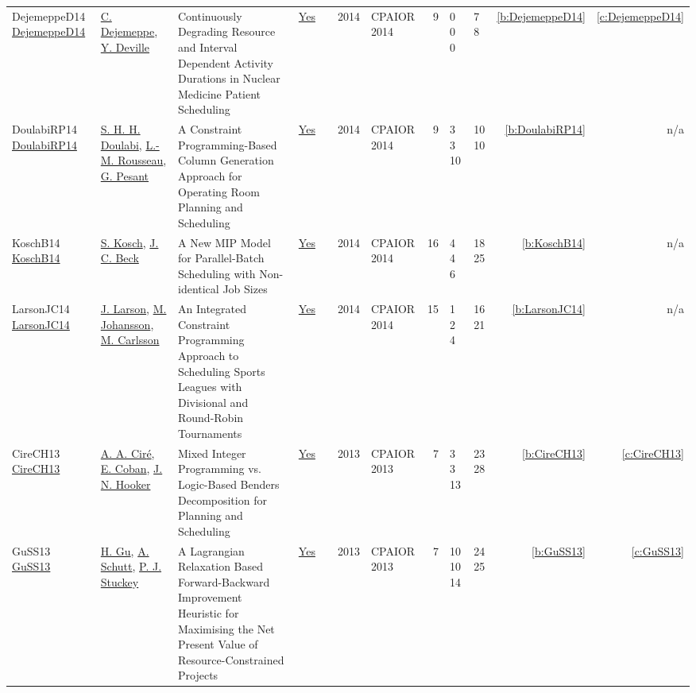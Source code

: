 {\begin{longtable}{>{\raggedright\arraybackslash}p{3cm}>{\raggedright\arraybackslash}p{4.5cm}>{\raggedright\arraybackslash}p{6.0cm}rrrp{2.5cm}rp{1cm}p{1cm}rr}
DejemeppeD14 \href{https://doi.org/10.1007/978-3-319-07046-9_20}{DejemeppeD14} & \hyperref[auth:a202]{C. Dejemeppe}, \hyperref[auth:a151]{Y. Deville} & \cellcolor{green!10}Continuously Degrading Resource and Interval Dependent Activity Durations in Nuclear Medicine Patient Scheduling & \href{../works/DejemeppeD14.pdf}{Yes} & \cite{DejemeppeD14} & 2014 & CPAIOR 2014 & 9 & 0 0 0 & 7 8 & \ref{b:DejemeppeD14} & \ref{c:DejemeppeD14}\\
DoulabiRP14 \href{https://doi.org/10.1007/978-3-319-07046-9_32}{DoulabiRP14} & \hyperref[auth:a330]{S. H. H. Doulabi}, \hyperref[auth:a326]{L.-M. Rousseau}, \hyperref[auth:a8]{G. Pesant} & A Constraint Programming-Based Column Generation Approach for Operating Room Planning and Scheduling & \href{../works/DoulabiRP14.pdf}{Yes} & \cite{DoulabiRP14} & 2014 & CPAIOR 2014 & 9 & 3 3 10 & 10 10 & \ref{b:DoulabiRP14} & n/a\\
KoschB14 \href{https://doi.org/10.1007/978-3-319-07046-9_5}{KoschB14} & \hyperref[auth:a327]{S. Kosch}, \hyperref[auth:a89]{J. C. Beck} & A New {MIP} Model for Parallel-Batch Scheduling with Non-identical Job Sizes & \href{../works/KoschB14.pdf}{Yes} & \cite{KoschB14} & 2014 & CPAIOR 2014 & 16 & 4 4 6 & 18 25 & \ref{b:KoschB14} & n/a\\
LarsonJC14 \href{https://doi.org/10.1007/978-3-319-07046-9_11}{LarsonJC14} & \hyperref[auth:a1413]{J. Larson}, \hyperref[auth:a75]{M. Johansson}, \hyperref[auth:a91]{M. Carlsson} & An Integrated Constraint Programming Approach to Scheduling Sports Leagues with Divisional and Round-Robin Tournaments & \href{../works/LarsonJC14.pdf}{Yes} & \cite{LarsonJC14} & 2014 & CPAIOR 2014 & 15 & 1 2 4 & 16 21 & \ref{b:LarsonJC14} & n/a\\
CireCH13 \href{https://doi.org/10.1007/978-3-642-38171-3_22}{CireCH13} & \hyperref[auth:a157]{A. A. Cir{\'{e}}}, \hyperref[auth:a335]{E. Coban}, \hyperref[auth:a160]{J. N. Hooker} & Mixed Integer Programming vs. Logic-Based Benders Decomposition for Planning and Scheduling & \href{../works/CireCH13.pdf}{Yes} & \cite{CireCH13} & 2013 & CPAIOR 2013 & 7 & 3 3 13 & 23 28 & \ref{b:CireCH13} & \ref{c:CireCH13}\\
GuSS13 \href{https://doi.org/10.1007/978-3-642-38171-3_24}{GuSS13} & \hyperref[auth:a336]{H. Gu}, \hyperref[auth:a124]{A. Schutt}, \hyperref[auth:a125]{P. J. Stuckey} & A Lagrangian Relaxation Based Forward-Backward Improvement Heuristic for Maximising the Net Present Value of Resource-Constrained Projects & \href{../works/GuSS13.pdf}{Yes} & \cite{GuSS13} & 2013 & CPAIOR 2013 & 7 & 10 10 14 & 24 25 & \ref{b:GuSS13} & \ref{c:GuSS13}\\

\end{longtable}}
